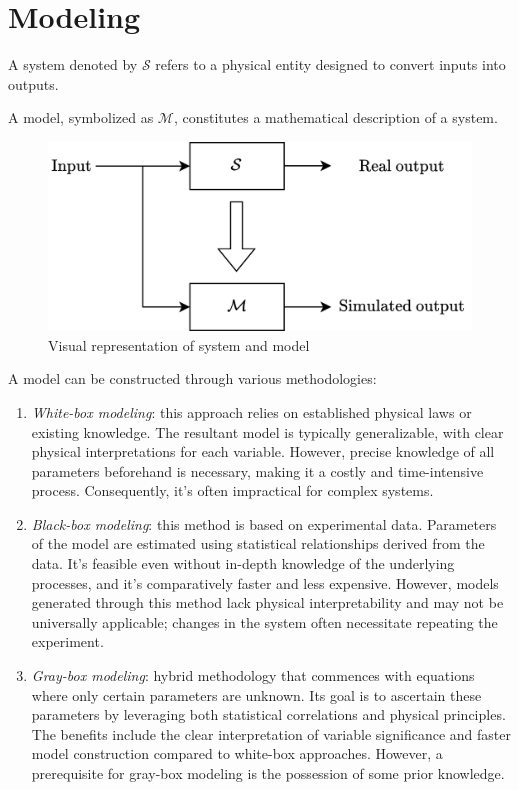 \section{Modeling}

\begin{definition}
    A system denoted by $\mathcal{S}$ refers to a physical entity designed to convert inputs into outputs.
\end{definition}
\begin{definition}
    A model, symbolized as $\mathcal{M}$, constitutes a mathematical description of a system.
\end{definition}

\begin{figure}[H]
    \centering
    \includegraphics[width=0.5\linewidth]{images/model.png}
    \caption{Visual representation of system and model}
\end{figure}

A model can be constructed through various methodologies:
\begin{enumerate}
    \item \textit{White-box modeling}: this approach relies on established physical laws or existing knowledge. 
        The resultant model is typically generalizable, with clear physical interpretations for each variable.
        However, precise knowledge of all parameters beforehand is necessary, making it a costly and time-intensive process. 
        Consequently, it's often impractical for complex systems.
    \item \textit{Black-box modeling}: this method is based on experimental data. 
        Parameters of the model are estimated using statistical relationships derived from the data. 
        It's feasible even without in-depth knowledge of the underlying processes, and it's comparatively faster and less expensive. 
        However, models generated through this method lack physical interpretability and may not be universally applicable; changes in the system often necessitate repeating the experiment.
    \item \textit{Gray-box modeling}: hybrid methodology that commences with equations where only certain parameters are unknown. 
        Its goal is to ascertain these parameters by leveraging both statistical correlations and physical principles. 
        The benefits include the clear interpretation of variable significance and faster model construction compared to white-box approaches. 
        However, a prerequisite for gray-box modeling is the possession of some prior knowledge.
\end{enumerate}